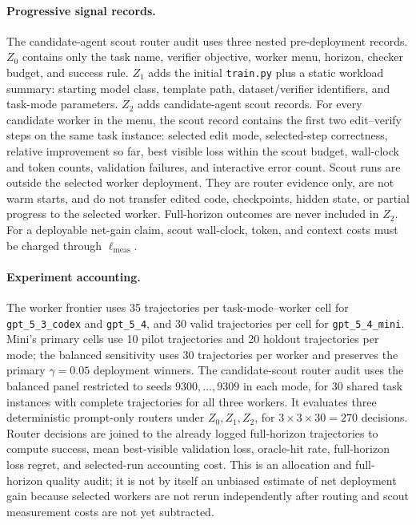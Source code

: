 \documentclass{article}
\begin{document}
\paragraph{Progressive signal records.}
The candidate-agent scout router audit uses three nested pre-deployment records.
\(Z_0\) contains only the task name, verifier objective, worker menu, horizon, checker budget, and success rule.
\(Z_1\) adds the initial \texttt{train.py} plus a static workload summary: starting model class, template path, dataset/verifier identifiers, and task-mode parameters.
\(Z_2\) adds candidate-agent scout records.
For every candidate worker in the menu, the scout record contains the first two edit--verify steps on the same task instance: selected edit mode, selected-step correctness, relative improvement so far, best visible loss within the scout budget, wall-clock and token counts, validation failures, and interactive error count.
Scout runs are outside the selected worker deployment.
They are router evidence only, are not warm starts, and do not transfer edited code, checkpoints, hidden state, or partial progress to the selected worker.
Full-horizon outcomes are never included in \(Z_2\).
For a deployable net-gain claim, scout wall-clock, token, and context costs must be charged through \(\ell_{\mathrm{meas}}\).

\paragraph{Experiment accounting.}
The worker frontier uses 35 trajectories per task-mode--worker cell for \texttt{gpt\_5\_3\_codex} and \texttt{gpt\_5\_4}, and 30 valid trajectories per cell for \texttt{gpt\_5\_4\_mini}.
Mini's primary cells use 10 pilot trajectories and 20 holdout trajectories per mode; the balanced sensitivity uses 30 trajectories per worker and preserves the primary \(\gamma=0.05\) deployment winners.
The candidate-scout router audit uses the balanced panel restricted to seeds \(9300,\ldots,9309\) in each mode, for 30 shared task instances with complete trajectories for all three workers.
It evaluates three deterministic prompt-only routers under \(Z_0,Z_1,Z_2\), for \(3\times 3\times 30=270\) decisions.
Router decisions are joined to the already logged full-horizon trajectories to compute success, mean best-visible validation loss, oracle-hit rate, full-horizon loss regret, and selected-run accounting cost.
This is an allocation and full-horizon quality audit; it is not by itself an unbiased estimate of net deployment gain because selected workers are not rerun independently after routing and scout measurement costs are not yet subtracted.
\end{document}
